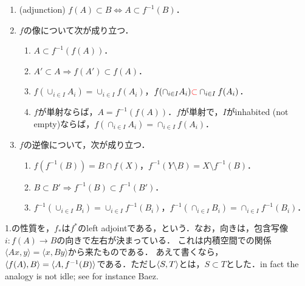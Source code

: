 \documentclass[uplatex,dvipdfmx]{jsreport}
\begin{document}
\begin{proposition}[像と逆像と集合演算の絡み合い]\mbox{}\label{prop-functoriality-of-image-and-inverse-image-mappings}
    \begin{enumerate}
        \item (adjunction) $f(A)\subset B\Leftrightarrow A\subset f^{-1}(B)$．
        \item $f$の像について次が成り立つ．
        \begin{enumerate}[(1)]
            \item $A\subset f^{-1}(f(A))$．
            \item $A'\subset A\Rightarrow f(A')\subset f(A)$．
            \item $f(\cup_{i\in I}A_i)=\cup_{i\in I}f(A_i)$，$f(\cap_{i\in I}A_i)\textcolor{red}{\subset}\cap_{i\in I}f(A_i)$．
            \item $f$が単射ならば，$A=f^{-1}(f(A))$．$f$が単射で，$I$がinhabited (not empty)ならば，$f(\cap_{i\in I}A_i)=\cap_{i\in I}f(A_i)$．
        \end{enumerate}
        \item $f$の逆像について，次が成り立つ．
        \begin{enumerate}[(1)]
            \item $f(f^{-1}(B))=B\cap f(X)$，$f^{-1}(Y\setminus B)=X\setminus f^{-1}(B)$．
            \item $B\subset B'\Rightarrow f^{-1}(B)\subset f^{-1}(B')$．
            \item $f^{-1}(\cup_{i\in I}B_i)=\cup_{i\in I}f^{-1}(B_i)$，$f^{-1}(\cap_{i\in I}B_i)=\cap_{i\in I}f^{-1}(B_i)$．
        \end{enumerate}
    \end{enumerate}
\end{proposition}
\begin{remark}
    1.の性質を，$f_*$は$f^*$のleft adjointである，という．なお，向きは，包含写像$i:f(A)\to B$の向きで左右が決まっている．
    これは内積空間での関係$\langle Ax,y\rangle=\langle x,By\rangle$から来たものである．
    あえて書くなら，$\langle f(A),B\rangle=\langle A,f^{-1}(B)\rangle$である．ただし$\langle S,T\rangle$とは，$S\subset T$とした．in fact the analogy is not idle; see for instance Baez.
\end{remark}
\end{document}
